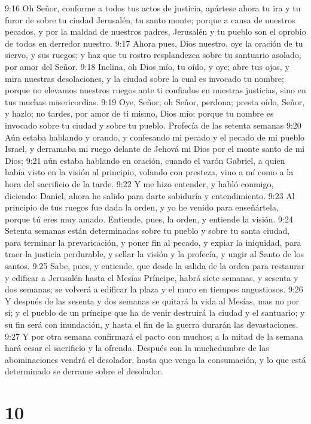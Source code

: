 9:16 Oh Señor, conforme a todos tus actos de justicia, apártese ahora tu ira y tu furor de sobre tu ciudad Jerusalén, tu santo monte; porque a causa de nuestros pecados, y por la maldad de nuestros padres, Jerusalén y tu pueblo son el oprobio de todos en derredor nuestro.  
9:17 Ahora pues, Dios nuestro, oye la oración de tu siervo, y sus ruegos; y haz que tu rostro resplandezca sobre tu santuario asolado, por amor del Señor.  
9:18 Inclina, oh Dios mío, tu oído, y oye; abre tus ojos, y mira nuestras desolaciones, y la ciudad sobre la cual es invocado tu nombre; porque no elevamos nuestros ruegos ante ti confiados en nuestras justicias, sino en tus muchas misericordias.  
9:19 Oye, Señor; oh Señor, perdona; presta oído, Señor, y hazlo; no tardes, por amor de ti mismo, Dios mío; porque tu nombre es invocado sobre tu ciudad y sobre tu pueblo.  
Profecía de las setenta semanas  
9:20 Aún estaba hablando y orando, y confesando mi pecado y el pecado de mi pueblo Israel, y derramaba mi ruego delante de Jehová mi Dios por el monte santo de mi Dios;  
9:21 aún estaba hablando en oración, cuando el varón Gabriel, a quien había visto en la visión al principio, volando con presteza, vino a mí como a la hora del sacrificio de la tarde.  
9:22 Y me hizo entender, y habló conmigo, diciendo: Daniel, ahora he salido para darte sabiduría y entendimiento. 
9:23 Al principio de tus ruegos fue dada la orden, y yo he venido para enseñártela, porque tú eres muy amado. Entiende, pues, la orden, y entiende la visión.  
9:24 Setenta semanas están determinadas sobre tu pueblo y sobre tu santa ciudad, para terminar la prevaricación, y poner fin al pecado, y expiar la iniquidad, para traer la justicia perdurable, y sellar la visión y la profecía, y ungir al Santo de los santos.  
9:25 Sabe, pues, y entiende, que desde la salida de la orden para restaurar y edificar a Jerusalén hasta el Mesías Príncipe, habrá siete semanas, y sesenta y dos semanas; se volverá a edificar la plaza y el muro en tiempos angustiosos.  
9:26 Y después de las sesenta y dos semanas se quitará la vida al Mesías, mas no por sí; y el pueblo de un príncipe que ha de venir destruirá la ciudad y el santuario; y su fin será con inundación, y hasta el fin de la guerra durarán las devastaciones.  
9:27 Y por otra semana confirmará el pacto con muchos; a la mitad de la semana hará cesar el sacrificio y la ofrenda. Después con la muchedumbre de las abominaciones vendrá el desolador, hasta que venga la consumación, y lo que está determinado se derrame sobre el desolador.  

\chapter{10}

